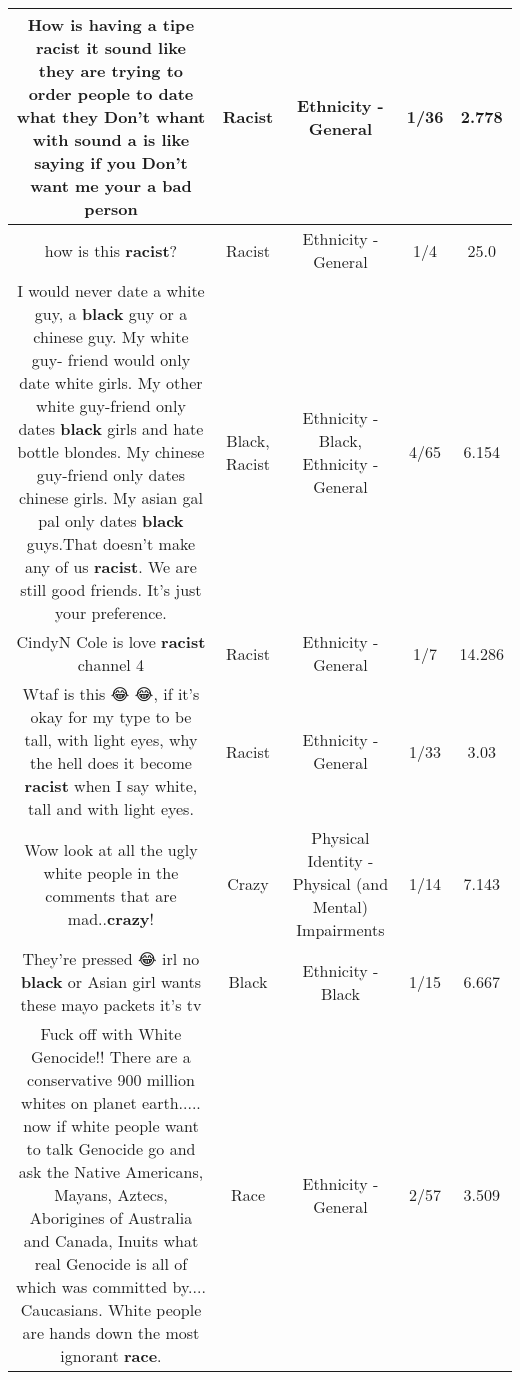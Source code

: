 \documentclass[11pt]{article}
\newlength\mylength
\begin{document}
\begin{center}
\begin{longtable}{|C{.65\mylength}|C{.30\mylength}|C{.12\mylength}|C{.12\mylength}|C{.12\mylength}|}
  \small How is having a tipe \textbf{racist}  it sound like they are trying to order people to date what they Don't whant with sound a is like saying  if you Don't want me your a bad person\normalsize   & Racist & Ethnicity - General & 1/36 & 2.778 \\  \hline
  \small how is this \textbf{racist}?\normalsize   & Racist & Ethnicity - General & 1/4 & 25.0 \\  \hline
  \small I would never date a white guy, a \textbf{black} guy or a chinese guy. My white guy- friend would only date white girls. My other white guy-friend only dates \textbf{black} girls and hate bottle blondes. My chinese guy-friend only dates chinese girls. My asian gal pal only dates \textbf{black} guys.That doesn't make any of us \textbf{racist}. We are still good friends. It's just your preference.\normalsize   & Black, Racist & Ethnicity - Black, Ethnicity - General & 4/65 & 6.154 \\  \hline
  \small CindyN Cole is love \textbf{racist} channel 4\normalsize   & Racist & Ethnicity - General & 1/7 & 14.286 \\  \hline
  \small Wtaf is this 😂 😂, if it's okay for my type to be tall, with light eyes, why the hell does it become \textbf{racist} when I say white, tall and with light eyes.\normalsize   & Racist & Ethnicity - General & 1/33 & 3.03 \\  \hline
  \small Wow look at all the ugly white people in the comments that are mad..\textbf{crazy}!\normalsize   & Crazy & Physical Identity - Physical (and Mental) Impairments & 1/14 & 7.143 \\  \hline
  \small They're pressed 😂 irl no \textbf{black} or Asian girl wants these mayo packets it's tv\normalsize   & Black & Ethnicity - Black & 1/15 & 6.667 \\  \hline
  \small Fuck off with White Genocide!! There are a conservative 900 million whites on planet earth..... now if white people want to talk Genocide go and ask the Native Americans, Mayans, Aztecs, Aborigines of Australia and Canada, Inuits what real Genocide is all of which was committed by.... Caucasians. White people are hands down the most ignorant \textbf{race}.\normalsize   & Race & Ethnicity - General & 2/57 & 3.509 \\  \hline

\end{longtable}
\end{center}
\end{document}
